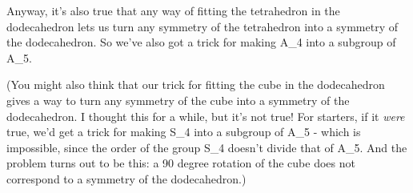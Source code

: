 Anyway, it's also true that any way of fitting the tetrahedron
in the dodecahedron lets us turn any symmetry
of the tetrahedron into a symmetry of the dodecahedron.  
So we've also got a trick for making A_{4} into a subgroup of 
A_{5}.

(You might also think that our trick for fitting the cube in
the dodecahedron gives a way to turn any symmetry of the
cube into a symmetry of the dodecahedron.   I thought this for a while,
but it's not true!  For starters, if it \emph{were} true, we'd get
a trick for making S_{4} into a subgroup of A_{5} -
which is impossible, since the order of the group S_{4} 
doesn't divide that of A_{5}.  And the problem turns out
to be this: a 90 degree rotation of the cube does not correspond
to a symmetry of the dodecahedron.)



